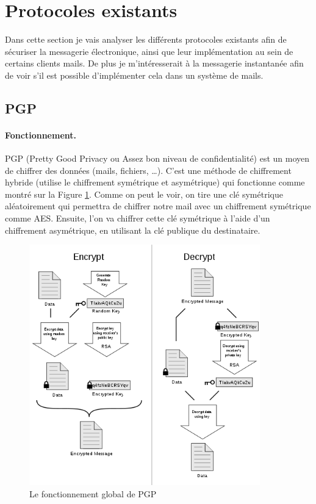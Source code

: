 \section{Protocoles existants}
Dans cette section je vais analyser les différents protocoles existants afin de sécuriser la messagerie électronique, ainsi que leur implémentation au sein de certains clients mails. De plus je m'intéresserait à la messagerie instantanée afin de voir s'il est possible d'implémenter cela dans un système de mails.
\subsection{PGP}
\paragraph*{Fonctionnement.}
PGP (Pretty Good Privacy ou Assez bon niveau de confidentialité) est un moyen de chiffrer des données (mails, fichiers, …). C’est une méthode de chiffrement hybride (utilise le chiffrement symétrique et asymétrique) qui fonctionne comme montré sur la Figure \ref{fig:PGP_101}. Comme on peut le voir, on tire une clé symétrique aléatoirement qui permettra de chiffrer notre mail avec un chiffrement symétrique comme AES. Ensuite, l'on va chiffrer cette clé symétrique à l'aide d'un chiffrement asymétrique, en utilisant la clé publique du destinataire.

\begin{figure}[h!]
\includegraphics[width=10cm]{images/PGP_101.png}
\centering
\caption{Le fonctionnement global de PGP}
\label{fig:PGP_101}
\end{figure}

